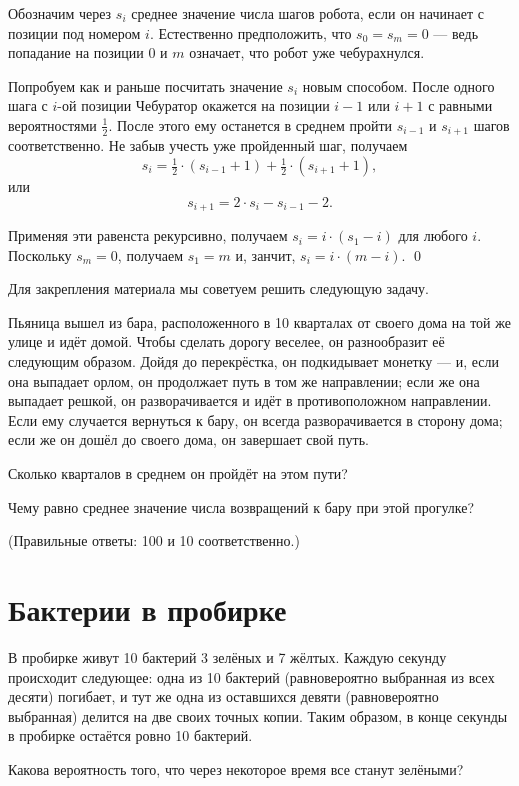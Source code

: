 \documentclass{article}
\begin{document}
Обозначим через $s_i$ среднее значение числа шагов робота, если он начинает с позиции под номером $i$.
Естественно предположить, что $s_0=s_{m}=0$ ---
ведь попадание на позиции $0$ и $m$ означает, что робот уже чебурахнулся.

Попробуем как и раньше посчитать значение $s_i$ новым способом.
После одного шага с $i$-ой позиции
Чебуратор окажется на позиции $i-1$ или $i+1$ с равными вероятностями $\tfrac12$.
После этого ему останется в среднем пройти $s_{i-1}$ и $s_{i+1}$ шагов соответственно. 
Не забыв учесть уже пройденный шаг, получаем
\[s_i=\tfrac12\cdot(s_{i-1}+1)+\tfrac12\cdot(s_{i+1}+1),\]
или 
\[s_{i+1}=2\cdot s_i-s_{i-1}-2.\]

Применяя эти равенста рекурсивно, получаем
$s_i=i\cdot(s_1-i)$
для любого $i$.
Поскольку $s_m=0$, получаем $s_1=m$ и, занчит,
$s_i=i\cdot(m-i)$.
\qed
\medskip

Для закрепления материала мы советуем решить следующую задачу.

Пьяница вышел из бара, расположенного в 10 кварталах от своего дома на той же улице и идёт домой.
Чтобы сделать дорогу веселее, он разнообразит её следующим образом. 
Дойдя до перекрёстка, он подкидывает монетку --- и, если она выпадает орлом, он продолжает путь в том же направлении; если же она выпадает решкой, он разворачивается и идёт в противоположном направлении. 
Если ему случается вернуться к бару, он всегда разворачивается в сторону дома; если же он дошёл до своего дома, он завершает свой путь. 

Сколько кварталов в среднем он пройдёт на этом пути?

Чему равно среднее значение числа возвращений к бару при этой прогулке?

(Правильные ответы: 100 и 10 соответственно.)%


\section{Бактерии в пробирке}

В пробирке живут 10 бактерий 3 зелёных и 7 жёлтых.
Каждую секунду происходит следующее: одна из 10 бактерий (равновероятно выбранная из всех десяти) погибает,
и тут же одна из оставшихся девяти (равновероятно выбранная)
 делится на две своих точных копии.
Таким образом,
в конце секунды в пробирке остаётся ровно 10 бактерий.

Какова вероятность того, что через некоторое время все станут зелёными?
\end{document}
